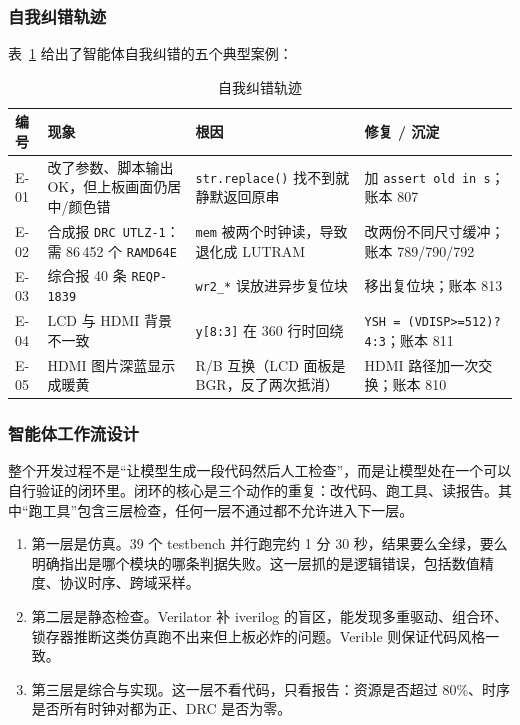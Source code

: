 \documentclass[withoutpreface,bwprint]{cumcmthesis}
\begin{document}
\subsubsection{自我纠错轨迹}

表~\ref{tab:selfcorr} 给出了智能体自我纠错的五个典型案例：

\begin{table}[H]
\centering
\caption{自我纠错轨迹}
\label{tab:selfcorr}
\begin{tabular}{p{1.0cm}p{3.6cm}p{4.2cm}p{4.2cm}}
\toprule[1.5pt]
\rowcolor{gray!25} 编号 & 现象 & 根因 & 修复 / 沉淀 \\
\midrule[1pt]
E-01 & 改了参数、脚本输出 OK，但上板画面仍居中/颜色错 & \texttt{str.replace()} 找不到就静默返回原串 & 加 \texttt{assert old in s}；账本 807 \\
E-02 & 合成报 \texttt{DRC UTLZ-1}：需 86\,452 个 \texttt{RAMD64E} & \texttt{mem} 被两个时钟读，导致退化成 LUTRAM & 改两份不同尺寸缓冲；账本 789/790/792 \\
E-03 & 综合报 40 条 \texttt{REQP-1839} & \texttt{wr2\_*} 误放进异步复位块 & 移出复位块；账本 813 \\
E-04 & LCD 与 HDMI 背景不一致 & \texttt{y[8:3]} 在 360 行时回绕 & \texttt{YSH = (VDISP>=512)?4:3}；账本 811 \\
E-05 & HDMI 图片深蓝显示成暖黄 & R/B 互换（LCD 面板是 BGR，反了两次抵消）& HDMI 路径加一次交换；账本 810 \\
\bottomrule[1.5pt]
\end{tabular}
\end{table}

\subsubsection{智能体工作流设计}

整个开发过程不是“让模型生成一段代码然后人工检查”，而是让模型处在一个可以自行验证的闭环里。闭环的核心是三个动作的重复：改代码、跑工具、读报告。其中“跑工具”包含三层检查，任何一层不通过都不允许进入下一层。

\begin{enumerate}
\item 第一层是仿真。39 个 testbench 并行跑完约 1 分 30 秒，结果要么全绿，要么明确指出是哪个模块的哪条判据失败。这一层抓的是逻辑错误，包括数值精度、协议时序、跨域采样。
\item 第二层是静态检查。Verilator 补 iverilog 的盲区，能发现多重驱动、组合环、锁存器推断这类仿真跑不出来但上板必炸的问题。Verible 则保证代码风格一致。
\item 第三层是综合与实现。这一层不看代码，只看报告：资源是否超过 80\%、时序是否所有时钟对都为正、DRC 是否为零。
\end{enumerate}
\end{document}
